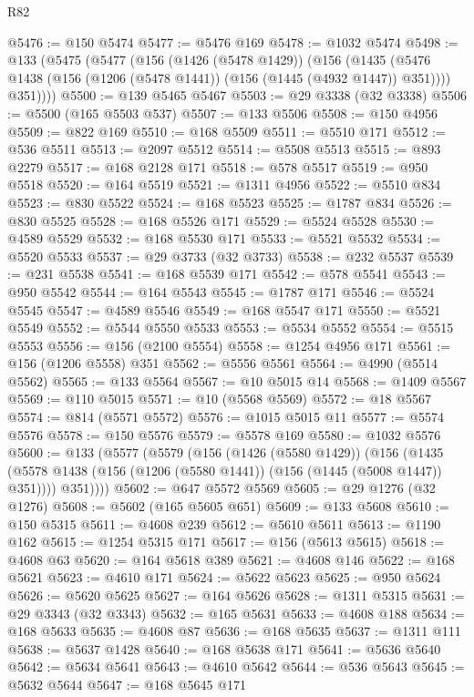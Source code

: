 \begin{lexlean}{R82}
\begin{coremodule}
@5476 := @150 @5474
@5477 := @5476 @169
@5478 := @1032 @5474
@5498 := @133
    (@5475
      (@5477
        (@156
          (@1426 (@5478 @1429))
          (@156
            (@1435 (@5476 @1438 (@156 (@1206 (@5478 @1441)) (@156 (@1445 (@4932 @1447)) @351))))
            @351))))
@5500 := @139 @5465 @5467
@5503 := @29 @3338 (@32 @3338)
@5506 := @5500 (@165 @5503 @537)
@5507 := @133 @5506
@5508 := @150 @4956
@5509 := @822 @169
@5510 := @168 @5509
@5511 := @5510 @171
@5512 := @536 @5511
@5513 := @2097 @5512
@5514 := @5508 @5513
@5515 := @893 @2279
@5517 := @168 @2128 @171
@5518 := @578 @5517
@5519 := @950 @5518
@5520 := @164 @5519
@5521 := @1311 @4956
@5522 := @5510 @834
@5523 := @830 @5522
@5524 := @168 @5523
@5525 := @1787 @834
@5526 := @830 @5525
@5528 := @168 @5526 @171
@5529 := @5524 @5528
@5530 := @4589 @5529
@5532 := @168 @5530 @171
@5533 := @5521 @5532
@5534 := @5520 @5533
@5537 := @29 @3733 (@32 @3733)
@5538 := @232 @5537
@5539 := @231 @5538
@5541 := @168 @5539 @171
@5542 := @578 @5541
@5543 := @950 @5542
@5544 := @164 @5543
@5545 := @1787 @171
@5546 := @5524 @5545
@5547 := @4589 @5546
@5549 := @168 @5547 @171
@5550 := @5521 @5549
@5552 := @5544 @5550 @5533
@5553 := @5534 @5552
@5554 := @5515 @5553
@5556 := @156 (@2100 @5554)
@5558 := @1254 @4956 @171
@5561 := @156 (@1206 @5558) @351
@5562 := @5556 @5561
@5564 := @4990 (@5514 @5562)
@5565 := @133 @5564
@5567 := @10 @5015 @14
@5568 := @1409 @5567
@5569 := @110 @5015
@5571 := @10 (@5568 @5569)
@5572 := @18 @5567
@5574 := @814 (@5571 @5572)
@5576 := @1015 @5015 @11
@5577 := @5574 @5576
@5578 := @150 @5576
@5579 := @5578 @169
@5580 := @1032 @5576
@5600 := @133
    (@5577
      (@5579
        (@156
          (@1426 (@5580 @1429))
          (@156
            (@1435 (@5578 @1438 (@156 (@1206 (@5580 @1441)) (@156 (@1445 (@5008 @1447)) @351))))
            @351))))
@5602 := @647 @5572 @5569
@5605 := @29 @1276 (@32 @1276)
@5608 := @5602 (@165 @5605 @651)
@5609 := @133 @5608
@5610 := @150 @5315
@5611 := @4608 @239
@5612 := @5610 @5611
@5613 := @1190 @162
@5615 := @1254 @5315 @171
@5617 := @156 (@5613 @5615)
@5618 := @4608 @63
@5620 := @164 @5618 @389
@5621 := @4608 @146
@5622 := @168 @5621
@5623 := @4610 @171
@5624 := @5622 @5623
@5625 := @950 @5624
@5626 := @5620 @5625
@5627 := @164 @5626
@5628 := @1311 @5315
@5631 := @29 @3343 (@32 @3343)
@5632 := @165 @5631
@5633 := @4608 @188
@5634 := @168 @5633
@5635 := @4608 @87
@5636 := @168 @5635
@5637 := @1311 @111
@5638 := @5637 @1428
@5640 := @168 @5638 @171
@5641 := @5636 @5640
@5642 := @5634 @5641
@5643 := @4610 @5642
@5644 := @536 @5643
@5645 := @5632 @5644
@5647 := @168 @5645 @171

\end{coremodule}
\end{lexlean}
